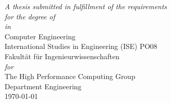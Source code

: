 \documentclass[
11pt, %
oneside, %
english, %
singlespacing, %
parskip, %
headsepline, %
]{MastersDoctoralThesis} %
\begin{document}
\begin{titlepage}
\begin{center}

\footnotesize \textit{A thesis submitted in fulfillment of the requirements\\ for the degree of \degreename}\\[0.3cm] %
\textit{in}\\[0.4cm]
\large Computer Engineering\\
International Studies in Engineering (ISE) PO08\\
Fakultät für Ingenieurwissenschaften\\[0.5cm] %
\footnotesize \textit{for}\\[0.4cm]
\large The High Performance Computing Group\\
Department Engineering\\[2cm] %
 

{\large \today}\\[4cm] %
 
\vfill
\end{center}
\end{titlepage}
\end{document}
